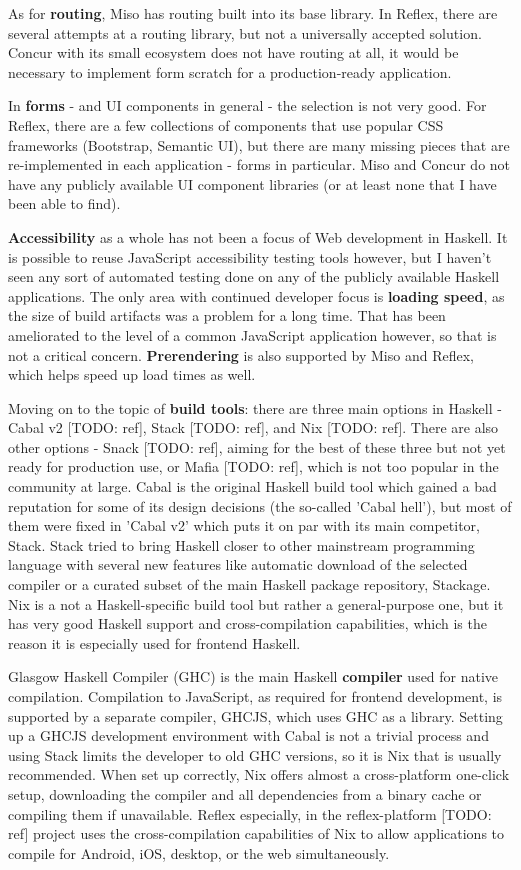 \documentclass[english,odsaz]{fitthesis}
\begin{document}
As for \textbf{routing}, Miso has routing built into its base library. In Reflex, there
are several attempts at a routing library, but not a universally accepted
solution. Concur with its small ecosystem does not have routing at all, it would
be necessary to implement form scratch for a production-ready application.

In \textbf{forms} - and UI components in general - the selection is not very good. For
Reflex, there are a few collections of components that use popular CSS
frameworks (Bootstrap, Semantic UI), but there are many missing pieces that are
re-implemented in each application - forms in particular. Miso and Concur do not have any publicly
available UI component libraries (or at least none that I have been able to find).

\textbf{Accessibility} as a whole has not been a focus of Web development in Haskell. It
is possible to reuse JavaScript accessibility testing tools however, but I
haven't seen any sort of automated testing done on any of the publicly available
Haskell applications. The only area with continued developer focus is \textbf{loading
speed}, as the size of build artifacts was a problem for a long time. That has
been ameliorated to the level of a common JavaScript application however, so
that is not a critical concern. \textbf{Prerendering} is also supported by Miso and
Reflex, which helps speed up load times as well.

Moving on to the topic of \textbf{build tools}: there are three main options in Haskell -
Cabal v2 [TODO: ref], Stack [TODO: ref], and Nix [TODO: ref]. There are also
other options - Snack [TODO: ref], aiming for the best of these three but not
yet ready for production use, or Mafia [TODO: ref], which is not too popular in
the community at large. Cabal is the original Haskell build tool which gained a
bad reputation for some of its design decisions (the so-called 'Cabal hell'),
but most of them were fixed in 'Cabal v2' which puts it on par with its main
competitor, Stack. Stack tried to bring Haskell closer to other mainstream
programming language with several new features like automatic download of the
selected compiler or a curated subset of the main Haskell package repository,
Stackage. Nix is a not a Haskell-specific build tool but rather a
general-purpose one, but it has very good Haskell support and cross-compilation
capabilities, which is the reason it is especially used for frontend Haskell.

Glasgow Haskell Compiler (GHC) is the main Haskell \textbf{compiler} used for native
compilation. Compilation to JavaScript, as required for frontend development, is
supported by a separate compiler, GHCJS, which uses GHC as a library. Setting up
a GHCJS development environment with Cabal is not a trivial process and using
Stack limits the developer to old GHC versions, so it is Nix that is usually
recommended. When set up correctly, Nix offers almost a cross-platform one-click
setup, downloading the compiler and all dependencies from a binary cache or
compiling them if unavailable. Reflex especially, in the reflex-platform [TODO:
ref] project uses the cross-compilation capabilities of Nix to allow
applications to compile for Android, iOS, desktop, or the web simultaneously.
\end{document}
